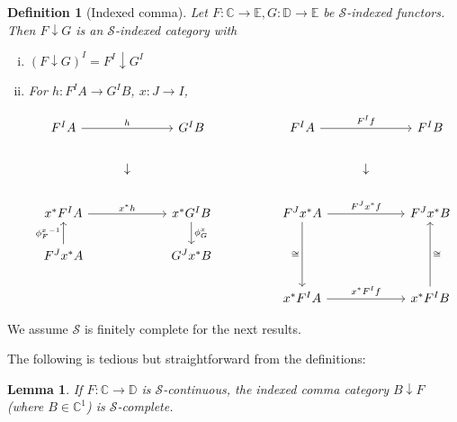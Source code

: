 \documentclass[10pt, oneside]{article}
\newtheorem{definition}[theorem]{Definition}
\newtheorem{lemma}[theorem]{Lemma}
\begin{document}
\begin{definition}[Indexed comma]
    Let $F: \mathbb{C} \to \mathbb{E}, G: \mathbb{D} \to \mathbb{E}$ be $\mathcal{S}$-indexed functors. Then $F \downarrow G$ is an $\mathcal{S}$-indexed category with

    \begin{enumerate}[i)]
        \item $\left( F \downarrow G \right)^I = F^I \downarrow G^I$

        \item For $h: F^IA \to G^IB$, $x: J \to I$,

        \[\begin{tikzcd}[ampersand replacement=\&]
	{F^IA} \&\& {G^IB} \&\& {F^IA} \&\& {F^IB} \\
	\& \downarrow \&\&\&\& \downarrow \\
	{x^\ast F^I A} \&\& {x^\ast G^I B} \&\& {F^J x^\ast A} \&\& {F^J x^\ast B} \\
	{F^J x^\ast A} \&\& {G^J x^\ast B} \\
	\&\&\&\& {x^\ast F^I A} \&\& {x^\ast F^I B}
	\arrow["h", from=1-1, to=1-3]
	\arrow["{x^\ast h}", from=3-1, to=3-3]
	\arrow["{\phi_G^x}", from=3-3, to=4-3]
	\arrow["{{\phi_F^x}^{-1}}", from=4-1, to=3-1]
	\arrow["{F^If}", from=1-5, to=1-7]
	\arrow["\cong"', from=3-5, to=5-5]
	\arrow["{F^J x^\ast f}", from=3-5, to=3-7]
	\arrow["{x^\ast F^If}", from=5-5, to=5-7]
	\arrow["\cong"', from=5-7, to=3-7]
\end{tikzcd}\]
    \end{enumerate}
\end{definition}

We assume $\mathcal{S}$ is finitely complete for the next results.

The following is tedious but straightforward from the definitions:

\begin{lemma}
    If $F: \mathbb{C} \to \mathbb{D}$ is $\mathcal{S}$-continuous, the indexed comma category $B \downarrow F$ (where $B \in \mathbb{C}^1$) is $\mathcal{S}$-complete.
\end{lemma}
\end{document}
